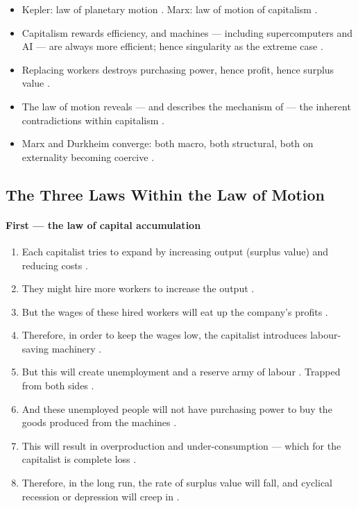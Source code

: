 \begin{QuickRevision}
\begin{itemize}
    \item Kepler: law of planetary motion . Marx: law of motion of capitalism .
    \item Capitalism rewards efficiency, and machines --- including supercomputers and AI --- are always more efficient; hence singularity as the extreme case .
    \item Replacing workers destroys purchasing power, hence profit, hence surplus value .
    \item The law of motion reveals --- and describes the mechanism of --- the inherent contradictions within capitalism .
    \item Marx and Durkheim converge: both macro, both structural, both on externality becoming coercive .
\end{itemize}
\end{QuickRevision}

\subsection{The Three Laws Within the Law of Motion}

\paragraph{First --- the law of capital accumulation}
\begin{enumerate}
    \item Each capitalist tries to expand by increasing output (surplus value) and reducing costs .
    \item They might hire more workers to increase the output .
    \item But the wages of these hired workers will eat up the company's profits .
    \item Therefore, in order to keep the wages low, the capitalist introduces labour-saving machinery .
    \item But this will create unemployment and a reserve army of labour . Trapped from both sides .
    \item And these unemployed people will not have purchasing power to buy the goods produced from the machines .
    \item This will result in overproduction and under-consumption --- which for the capitalist is complete loss .
    \item Therefore, in the long run, the rate of surplus value will fall, and cyclical recession or depression will creep in .
\end{enumerate}

